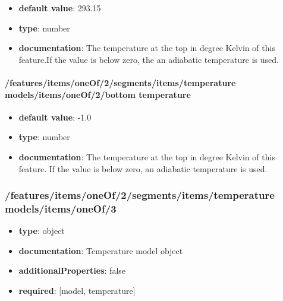 \begin{itemize}\item {\bf default value}: 293.15
\item {\bf type}: number
\item {\bf documentation}: The temperature at the top in degree Kelvin of this feature.If the value is below zero, the an adiabatic temperature is used.
\end{itemize}\paragraph{/features/items/oneOf/2/segments/items/temperature models/items/oneOf/2/bottom temperature}
\begin{itemize}\item {\bf default value}: -1.0
\item {\bf type}: number
\item {\bf documentation}: The temperature at the top in degree Kelvin of this feature. If the value is below zero, an adiabatic temperature is used.
\end{itemize}\subsubsection{/features/items/oneOf/2/segments/items/temperature models/items/oneOf/3}
\begin{itemize}\item {\bf type}: object
\item {\bf documentation}: Temperature model object
\item {\bf additionalProperties}: false
\item {\bf required}: [model, temperature]\end{itemize}
